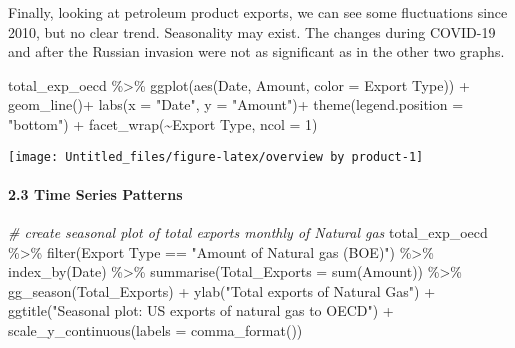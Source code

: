 \documentclass[
]{article}
\newenvironment{Shaded}{\begin{snugshade}}{\end{snugshade}}
\newcommand{\AttributeTok}[1]{\textcolor[rgb]{0.77,0.63,0.00}{#1}}
\newcommand{\CommentTok}[1]{\textcolor[rgb]{0.56,0.35,0.01}{\textit{#1}}}
\newcommand{\DecValTok}[1]{\textcolor[rgb]{0.00,0.00,0.81}{#1}}
\newcommand{\FunctionTok}[1]{\textcolor[rgb]{0.00,0.00,0.00}{#1}}
\newcommand{\NormalTok}[1]{#1}
\newcommand{\SpecialCharTok}[1]{\textcolor[rgb]{0.00,0.00,0.00}{#1}}
\newcommand{\StringTok}[1]{\textcolor[rgb]{0.31,0.60,0.02}{#1}}
\begin{document}
Finally, looking at petroleum product exports, we can see some
fluctuations since 2010, but no clear trend. Seasonality may exist. The
changes during COVID-19 and after the Russian invasion were not as
significant as in the other two graphs.

\begin{Shaded}
\begin{Highlighting}[]
\NormalTok{total\_exp\_oecd }\SpecialCharTok{\%\textgreater{}\%}  
  \FunctionTok{ggplot}\NormalTok{(}\FunctionTok{aes}\NormalTok{(Date, Amount, }\AttributeTok{color =} \StringTok{\textasciigrave{}}\AttributeTok{Export Type}\StringTok{\textasciigrave{}}\NormalTok{)) }\SpecialCharTok{+}
  \FunctionTok{geom\_line}\NormalTok{()}\SpecialCharTok{+}
  \FunctionTok{labs}\NormalTok{(}\AttributeTok{x =} \StringTok{"Date"}\NormalTok{, }\AttributeTok{y =} \StringTok{"Amount"}\NormalTok{)}\SpecialCharTok{+}
  \FunctionTok{theme}\NormalTok{(}\AttributeTok{legend.position =} \StringTok{"bottom"}\NormalTok{) }\SpecialCharTok{+}
  \FunctionTok{facet\_wrap}\NormalTok{(}\SpecialCharTok{\textasciitilde{}}\StringTok{\textasciigrave{}}\AttributeTok{Export Type}\StringTok{\textasciigrave{}}\NormalTok{, }\AttributeTok{ncol =} \DecValTok{1}\NormalTok{)}
\end{Highlighting}
\end{Shaded}

\begin{center}\texttt{[image: Untitled\_files/figure-latex/overview by product-1]} \end{center}

\hypertarget{time-series-patterns}{%
\paragraph{2.3 Time Series Patterns}\label{time-series-patterns}}

\begin{Shaded}
\begin{Highlighting}[]
\CommentTok{\# create seasonal plot of total exports monthly of Natural gas}
\NormalTok{total\_exp\_oecd }\SpecialCharTok{\%\textgreater{}\%} \FunctionTok{filter}\NormalTok{(}\StringTok{\textasciigrave{}}\AttributeTok{Export Type}\StringTok{\textasciigrave{}} \SpecialCharTok{==} \StringTok{"Amount of Natural gas (BOE)"}\NormalTok{) }\SpecialCharTok{\%\textgreater{}\%} 
  \FunctionTok{index\_by}\NormalTok{(Date) }\SpecialCharTok{\%\textgreater{}\%} 
  \FunctionTok{summarise}\NormalTok{(}\AttributeTok{Total\_Exports =} \FunctionTok{sum}\NormalTok{(}\StringTok{\textasciigrave{}}\AttributeTok{Amount}\StringTok{\textasciigrave{}}\NormalTok{)) }\SpecialCharTok{\%\textgreater{}\%} 
  \FunctionTok{gg\_season}\NormalTok{(Total\_Exports) }\SpecialCharTok{+}
  \FunctionTok{ylab}\NormalTok{(}\StringTok{"Total exports  of Natural Gas"}\NormalTok{) }\SpecialCharTok{+}
  \FunctionTok{ggtitle}\NormalTok{(}\StringTok{"Seasonal plot: US exports of natural gas to OECD"}\NormalTok{) }\SpecialCharTok{+}
  \FunctionTok{scale\_y\_continuous}\NormalTok{(}\AttributeTok{labels =} \FunctionTok{comma\_format}\NormalTok{())}
\end{Highlighting}
\end{Shaded}
\end{document}
